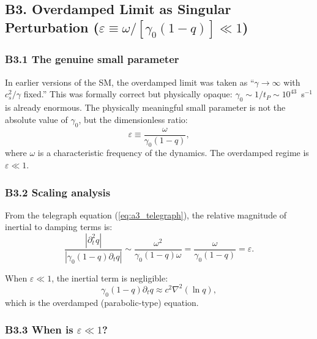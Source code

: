 \documentclass[reprint]{revtex4-2}
\begin{document}
\subsection{B3. Overdamped Limit as Singular Perturbation ($\varepsilon \equiv \omega/[\gamma_0(1-q)] \ll 1$)}

\subsubsection{B3.1 The genuine small parameter}

In earlier versions of the SM, the overdamped limit was taken as ``$\gamma\to\infty$ with $c_s^2/\gamma$ fixed.'' This was formally correct but physically opaque: $\gamma_0 \sim 1/t_P \sim 10^{43}$~s$^{-1}$ is already enormous. The physically meaningful small parameter is not the absolute value of $\gamma_0$, but the dimensionless ratio:
\begin{equation}
\boxed{\varepsilon \equiv \frac{\omega}{\gamma_0(1-q)}},
\label{eq:epsilon_def}
\end{equation}
where $\omega$ is a characteristic frequency of the dynamics. The overdamped regime is $\varepsilon \ll 1$.

\subsubsection{B3.2 Scaling analysis}

From the telegraph equation (\ref{eq:a3_telegraph}), the relative magnitude of inertial to damping terms is:
\begin{equation}
\frac{|\partial_t^2 q|}{|\gamma_0(1-q)\partial_t q|} \sim \frac{\omega^2}{\gamma_0(1-q)\omega} = \frac{\omega}{\gamma_0(1-q)} = \varepsilon.
\end{equation}

When $\varepsilon \ll 1$, the inertial term is negligible:
\begin{equation}
\gamma_0(1-q)\partial_t q \approx c^2\nabla^2(\ln q),
\end{equation}
which is the overdamped (parabolic-type) equation.

\subsubsection{B3.3 When is $\varepsilon \ll 1$?}
\end{document}
